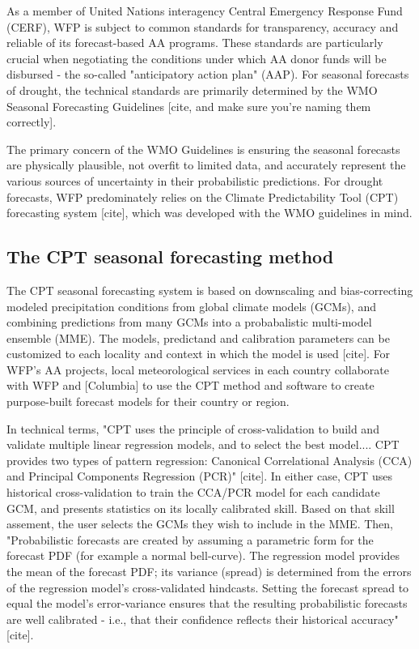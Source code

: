 \documentclass{ametsocV5}
\begin{document}
As a member of United Nations interagency Central Emergency Response Fund (CERF), WFP is subject to common standards for transparency, accuracy and reliable of its forecast-based AA programs. These standards are particularly crucial when negotiating the conditions under which AA donor funds will be disbursed - the so-called "anticipatory action plan" (AAP). For seasonal forecasts of drought, the technical standards are primarily determined by the WMO Seasonal Forecasting Guidelines [cite, and make sure you're naming them correctly]. 

The primary concern of the WMO Guidelines is ensuring the seasonal forecasts are physically plausible, not overfit to limited data, and accurately represent the various sources of uncertainty in their probabilistic predictions. For drought forecasts, WFP predominately relies on the Climate Predictability Tool (CPT) forecasting system [cite], which was developed with the WMO guidelines in mind. 

\subsection{The CPT seasonal forecasting method}


The CPT seasonal forecasting system is based on downscaling and bias-correcting modeled precipitation conditions from global climate models (GCMs), and combining predictions from many GCMs into a probabalistic multi-model ensemble (MME). The models, predictand and calibration parameters can be customized to each locality and context in which the model is used [cite]. For WFP's AA projects, local meteorological services in each country collaborate with WFP and [Columbia] to use the CPT method and software to create purpose-built forecast models for their country or region. 

In technical terms, "CPT uses the principle of cross-validation to build and validate multiple linear regression models, and to select the best model.... CPT provides two types of pattern regression: Canonical Correlational Analysis (CCA) and Principal Components Regression (PCR)" [cite]. In either case, CPT uses historical cross-validation to train the CCA/PCR model for each candidate GCM, and presents statistics on its locally calibrated skill. Based on that skill assement, the user selects the GCMs they wish to include in the MME. Then, "Probabilistic forecasts are created by assuming a parametric form for the forecast PDF (for example a normal bell-curve). The regression model provides the mean of the forecast PDF; its variance (spread) is determined from the errors of the regression model’s cross-validated hindcasts. Setting the forecast spread to equal the model’s error-variance ensures that the resulting probabilistic forecasts are well calibrated - i.e., that their confidence reflects their historical accuracy" [cite]. 
\end{document}
